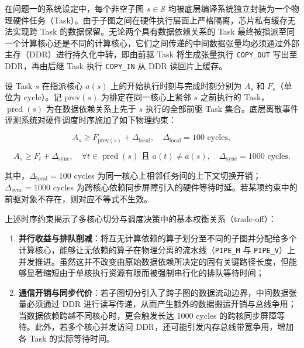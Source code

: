 \documentclass[anonymous,notoc]{gmcm2026}
\providecommand{\tightlist}{\setlength{\itemsep}{0pt}\setlength{\parskip}{0pt}}
\begin{document}
在问题一的系统设定中，每个非空子图 \(s \in \mathcal{S}\) 均被底层编译系统独立封装为一个物理硬件任务（Task）。由于子图之间在硬件执行层面上严格隔离，芯片私有缓存无法实现跨 Task 的数据保留。无论两个具有数据依赖关系的 Task 最终被指派至同一个计算核心还是不同的计算核心，它们之间传递的中间数据张量均必须通过外部主存（DDR）进行持久化中转，即由前驱 Task 将生成张量执行 \texttt{COPY\_OUT} 写出至 DDR，再由后继 Task 执行 \texttt{COPY\_IN} 从 DDR 读回片上缓存。

设 Task \(s\) 在指派核心 \(a(s)\) 上的开始执行时刻与完成时刻分别为 \(A_s\) 和 \(F_s\)（单位为 cycle）。记 \(\mathrm{prev}(s)\) 为排定在同一核心上紧邻 \(s\) 之前执行的 Task，\(\operatorname{pred}(s)\) 为在数据依赖关系上先于 \(s\) 执行的全部前驱 Task 集合。底层离散事件评测系统对硬件调度时序施加了如下物理约束：

\begin{equation}
A_s \ge F_{\mathrm{prev}(s)} + \Delta_{\mathrm{local}}, \quad \Delta_{\mathrm{local}} = 100 \text{ cycles},
\end{equation}

\begin{equation}
A_s \ge F_t + \Delta_{\mathrm{sync}}, \quad \forall t \in \operatorname{pred}(s) \text{ 且 } a(t) \ne a(s), \quad \Delta_{\mathrm{sync}} = 1000 \text{ cycles}.
\end{equation}

其中，\(\Delta_{\mathrm{local}} = 100\) cycles 为同一核心上相邻任务间的上下文切换开销；\(\Delta_{\mathrm{sync}} = 1000\) cycles 为跨核心依赖同步屏障引入的硬件等待时延。若某项约束中的前驱对象不存在，则对应不等式不生效。

上述时序约束揭示了多核心切分与调度决策中的基本权衡关系（trade-off）：

\begin{enumerate}
\def\labelenumi{\arabic{enumi}.}
\tightlist
\item
  \textbf{并行收益与排队削减}：将互无计算依赖的算子划分至不同的子图并分配给多个计算核心，能够让无依赖的算子在物理分离的流水线（\texttt{PIPE\_M} 与 \texttt{PIPE\_V}）上并发推进。虽然这并不改变由原始数据依赖所决定的固有关键路径长度，但能够显著缩短由于单核执行资源有限而被强制串行化的排队等待时间；
\item
  \textbf{通信开销与同步代价}：若子图切分引入了跨子图的数据流动边界，中间数据张量必须通过 DDR 进行读写传递，从而产生额外的数据搬运开销与总线争用；当数据依赖跨越不同核心时，更会触发长达 1000 cycles 的跨核同步屏障等待。此外，若多个核心并发访问 DDR，还可能引发内存总线带宽争用，增加各 Task 的实际等待时间。
\end{enumerate}
\end{document}
